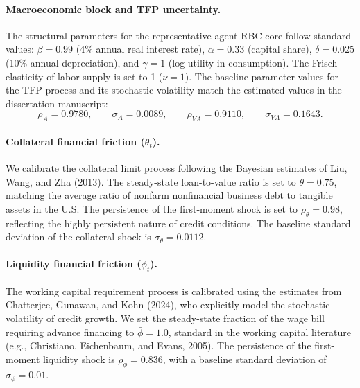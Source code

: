 \paragraph{Macroeconomic block and TFP uncertainty.}
The structural parameters for the representative-agent RBC core follow standard
values: \(\beta = 0.99\) (4\% annual real interest rate), \(\alpha = 0.33\) (capital
share), \(\delta = 0.025\) (10\% annual depreciation), and \(\gamma = 1\) (log
utility in consumption). The Frisch elasticity of labor supply is set to 1
(\(\nu = 1\)). The baseline parameter values for the TFP process and its stochastic
volatility match the estimated values in the dissertation manuscript:
\[
    \rho_A=0.9780,\qquad
    \sigma_A=0.0089,\qquad
    \rho_{VA}=0.9110,\qquad
    \sigma_{VA}=0.1643.
\]

\paragraph{Collateral financial friction (\(\theta_t\)).}
We calibrate the collateral limit process following the Bayesian estimates of
Liu, Wang, and Zha (2013). The steady-state loan-to-value ratio is set to
\(\bar{\theta} = 0.75\), matching the average ratio of nonfarm nonfinancial
business debt to tangible assets in the U.S. The persistence of the first-moment
shock is set to \(\rho_\theta = 0.98\), reflecting the highly persistent nature
of credit conditions. The baseline standard deviation of the collateral shock
is \(\sigma_\theta = 0.0112\).

\paragraph{Liquidity financial friction (\(\phi_t\)).}
The working capital requirement process is calibrated using the estimates from
Chatterjee, Gunawan, and Kohn (2024), who explicitly model the stochastic
volatility of credit growth. We set the steady-state fraction of the wage bill
requiring advance financing to \(\bar{\phi} = 1.0\), standard in the working
capital literature (e.g., Christiano, Eichenbaum, and Evans, 2005). The persistence
of the first-moment liquidity shock is \(\rho_\phi = 0.836\), with a baseline
standard deviation of \(\sigma_\phi = 0.01\).

